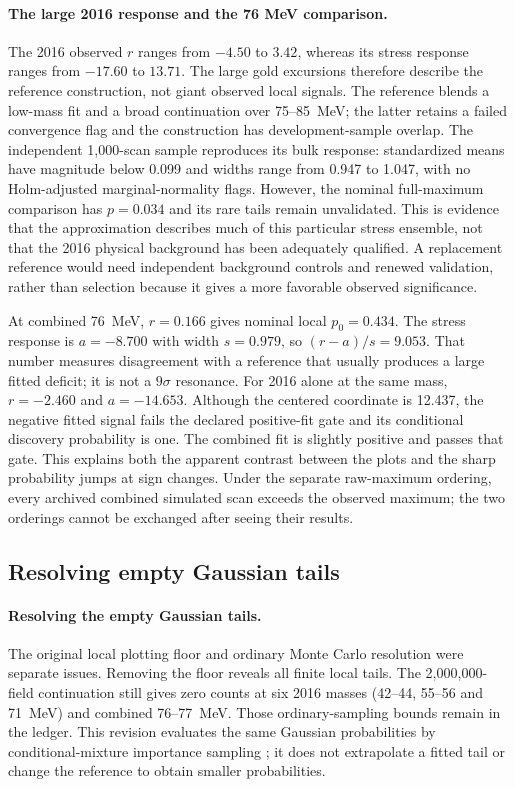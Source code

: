 \paragraph{The large 2016 response and the 76 MeV comparison.}
The 2016 observed $r$ ranges from $-4.50$ to $3.42$, whereas its stress
response ranges from $-17.60$ to $13.71$. The large gold excursions therefore
describe the reference construction, not giant observed local signals.
The reference blends a low-mass fit and a broad continuation over
75--85~MeV; the latter retains a failed convergence flag and the construction
has development-sample overlap. The independent 1,000-scan sample reproduces
its bulk response: standardized means have magnitude below 0.099 and widths
range from 0.947 to 1.047, with no Holm-adjusted marginal-normality flags.
However, the nominal full-maximum comparison has $p=0.034$ and its rare tails
remain unvalidated. This is evidence that the approximation describes much
of this particular stress ensemble, not that the 2016 physical background
has been adequately qualified. A replacement reference would need independent
background controls and renewed validation, rather than selection because
it gives a more favorable observed significance.

At combined 76~MeV, $r=0.166$ gives nominal local $p_0=0.434$.
The stress response is $a=-8.700$ with width $s=0.979$, so
$(r-a)/s=9.053$. That number measures disagreement with a reference that
usually produces a large fitted deficit; it is not a $9\sigma$ resonance.
For 2016 alone at the same mass, $r=-2.460$ and $a=-14.653$. Although the
centered coordinate is 12.437, the negative fitted signal fails the declared
positive-fit gate and its conditional discovery probability is one.
The combined fit is slightly positive and passes that gate. This explains
both the apparent contrast between the plots and the sharp probability
jumps at sign changes. Under the separate raw-maximum ordering, every
archived combined simulated scan exceeds the observed maximum; the two orderings
cannot be exchanged after seeing their results.

\subsection{Resolving empty Gaussian tails}
\paragraph{Resolving the empty Gaussian tails.}
The original local plotting floor and ordinary Monte Carlo resolution were
separate issues. Removing the floor reveals all finite local tails.
The 2,000,000-field continuation still gives zero counts at six 2016 masses
(42--44, 55--56 and 71~MeV) and combined 76--77~MeV. Those ordinary-sampling
bounds remain in the ledger. This revision evaluates the same Gaussian
probabilities by conditional-mixture importance sampling
\cite{OwenMaximovChertkov2019}; it does not extrapolate a fitted tail or
change the reference to obtain smaller probabilities.

